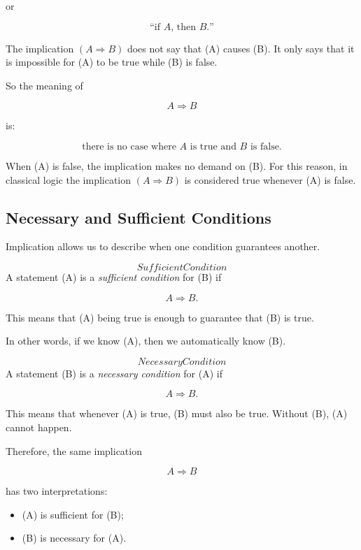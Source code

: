 or

\[
\text{``if $A$, then $B$.''}
\]

The implication $(A \Rightarrow B)$ does not say that (A) causes (B). It only
says that it is impossible for (A) to be true while (B) is false.

So the meaning of

\[
A \Rightarrow B
\]

is:

\[
\text{there is no case where $A$ is true and $B$ is false.}
\]

When (A) is false, the implication makes no demand on (B). For this reason,
in classical logic the implication $(A \Rightarrow B)$ is considered true
whenever (A) is false.

\subsection{Necessary and Sufficient Conditions}

Implication allows us to describe when one condition guarantees another.

\begin{definition}\[Sufficient Condition\]
A statement (A) is a \emph{sufficient condition} for (B) if

\[
A \Rightarrow B.
\]

This means that (A) being true is enough to guarantee that (B) is true.
\end{definition}

In other words, if we know (A), then we automatically know (B).

\begin{definition}\[Necessary Condition\]
A statement (B) is a \emph{necessary condition} for (A) if

\[
A \Rightarrow B.
\]

This means that whenever (A) is true, (B) must also be true. Without (B),
(A) cannot happen.
\end{definition}

Therefore, the same implication

\[
A \Rightarrow B
\]

has two interpretations:

\begin{itemize}
\item (A) is sufficient for (B);
\item (B) is necessary for (A).
\end{itemize}

